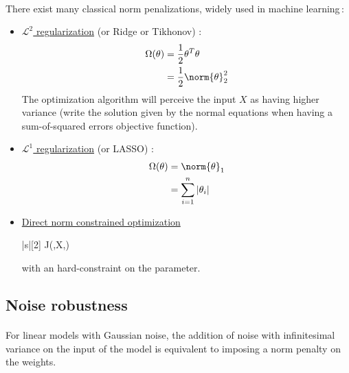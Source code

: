 \documentclass[a4paper]{article}
\newcommand\ml{machine learning\,}
\newcommand\targets{\boldsymbol{t}}
\begin{document}
{{			\paragraph{} There exist many classical norm penalizations, widely used in \ml : 
			\begin{itemize}
				\item \underline{$\mathcal{L}^2$ regularization} (or Ridge or Tikhonov) : 
					\begin{equation}
						\begin{aligned}
							\Omega(\theta) &= \frac{1}{2} \theta^T\theta\\
										&= \frac{1}{2}\norm{\theta}_2^2
						\end{aligned}
					\end{equation}
					The optimization algorithm will perceive the input $X$ as having higher variance (write the solution given by the normal equations when having a sum-of-squared errors objective function).
				\item \underline{$\mathcal{L}^1$ regularization} (or LASSO) : 
					\begin{equation}
						\begin{aligned}
							\Omega(\theta) &= \norm{\theta}_1 \\
										&= \sum_{i=1}^n \vert \theta_i \vert 
						\end{aligned}
					\end{equation}
				\item \underline{Direct norm constrained optimization}
						\begin{mini}|s|[2]
						{\theta}{J(\theta,X,\targets)}
						{}{}
						\addConstraint{\Omega(\theta)}{\leq k}
					\end{mini}
					with an hard-constraint on the parameter. 
			\end{itemize}

		}
		\subsection{Noise robustness}
		{
			\paragraph{} For linear models with Gaussian noise, the addition of noise with infinitesimal variance on the input of the model is equivalent to imposing a norm penalty on the weights. 
			
}}
\end{document}
